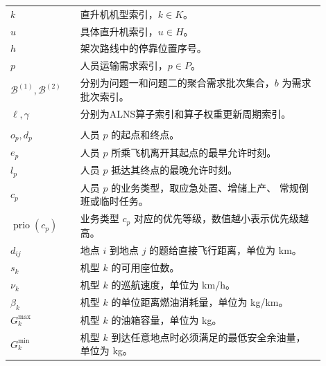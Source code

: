 \documentclass[UTF8,a4paper,zihao=5]{ctexart}
\begin{document}
\begin{longtable}{
    >{\centering\arraybackslash}p{0.20\linewidth}
    p{0.70\linewidth}
}
    $k$
    & 直升机机型索引，$k\in K$。 \\

    $u$
    & 具体直升机索引，$u\in H$。 \\

    $h$
    & 架次路线中的停靠位置序号。 \\

    $p$
    & 人员运输需求索引，$p\in P$。 \\

    $\mathcal{B}^{(1)},\mathcal{B}^{(2)}$
    & 分别为问题一和问题二的聚合需求批次集合，$b$ 为需求批次索引。 \\

    $\ell,\gamma$
    & 分别为ALNS算子索引和算子权重更新周期索引。 \\

    \midrule
    \multicolumn{2}{l}{\textbf{基础参数}} \\[2pt]

    $o_p,d_p$
    & 人员 $p$ 的起点和终点。 \\

    $e_p$
    & 人员 $p$ 所乘飞机离开其起点的最早允许时刻。 \\

    $l_p$
    & 人员 $p$ 抵达其终点的最晚允许时刻。 \\

    $c_p$
    & 人员 $p$ 的业务类型，取应急处置、增储上产、
    常规倒班或临时任务。 \\

    $\operatorname{prio}(c_p)$
    & 业务类型 $c_p$ 对应的优先等级，数值越小表示优先级越高。 \\

    $d_{ij}$
    & 地点 $i$ 到地点 $j$ 的题给直接飞行距离，单位为 km。 \\

    $s_k$
    & 机型 $k$ 的可用座位数。 \\

    $\nu_k$
    & 机型 $k$ 的巡航速度，单位为 km/h。 \\

    $\beta_k$
    & 机型 $k$ 的单位距离燃油消耗量，单位为 kg/km。 \\

    $G_k^{\max}$
    & 机型 $k$ 的油箱容量，单位为 kg。 \\

    $G_k^{\min}$
    & 机型 $k$ 到达任意地点时必须满足的最低安全余油量，
    单位为 kg。 \\


\end{longtable}
\end{document}
